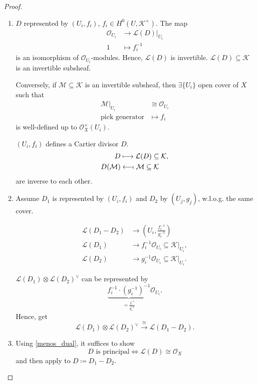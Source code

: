 \documentclass[12pt]{article}
\theoremstyle{definition}
\begin{document}
\begin{proof}
\begin{enumerate}[label=\roman*)]
\item $D$ represented by $(U_i,f_i)$, $f_i\in H^0(U,\mathcal{K}^{\times})$. The map
\begin{align*}
\mathcal{O}_{U_i}&\longrightarrow\mathcal{L}(D)|_{U_i}\\
1&\longmapsto f_i^{-1}
\end{align*}
is an isomorphism of $\mathcal{O}_{U_i}$-modules. Hence, $\mathcal{L}(D)$ is invertible. $\mathcal{L}(D)\subseteq\mathcal{K}$ is an invertible subsheaf.

Conversely, if $\mathcal{M}\subseteq\mathcal{K}$ is an invertible subsheaf, then $\exists\{U_i\}$ open cover of $X$ such that
\begin{align*}
\mathcal{M}|_{U_i}&\cong\mathcal{O}_{U_i}\\
\text{pick generator}&\mapsto f_i
\end{align*}
is well-defined up to $\mathcal{O}_X^{\times}(U_i)$.

$(U_i,f_i)$ defines a Cartier divisor $D$.
\begin{align*}
D&\longmapsto\mathcal{L}(D)\subseteq\mathcal{K},\\
D(\mathcal{M})&\longleftarrow\!\shortmid\mathcal{M}\subseteq\mathcal{K}
\end{align*}
are inverse to each other.

\item Assume $D_1$ is represented by $(U_i,f_i)$ and $D_2$ by $(U_j,g_j)$, w.l.o.g. the same cover.

\begin{align*}
\mathcal{L}(D_1-D_2)&\longrightarrow\left(U_i,\frac{f_i^{-1}}{g_i^{-1}}\right)\\
\mathcal{L}(D_1)&\longrightarrow f_i^{-1}\mathcal{O}_{U_i}\subseteq\mathcal{K}|_{U_i},\\
\mathcal{L}(D_2)&\longrightarrow g_i^{-1}\mathcal{O}_{U_i}\subseteq\mathcal{K}|_{U_i}.
\end{align*}

$\mathcal{L}(D_1)\otimes\mathcal{L}(D_2)^{\vee}$ can be represented by
\[\underbrace{f_i^{-1}\cdot(g_i^{-1})^{-1}}_{=\frac{f_i^{-1}}{g_i^{-1}}}\mathcal{O}_{U_i}.\]
Hence, get
\[\mathcal{L}(D_1)\otimes\mathcal{L}(D_2)^{\vee}\overset{\cong}{\longrightarrow}\mathcal{L}(D_1-D_2).\]

\item Using \ref{menos_dual}, it suffices to show
\[D\text{ is principal}\Longleftrightarrow\mathcal{L}(D)\cong\mathcal{O}_X\]
and then apply to $D\coloneqq D_1-D_2$.


\end{enumerate}
\end{proof}
\end{document}

